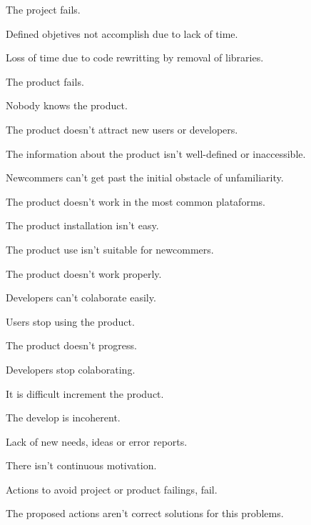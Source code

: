 \documentclass[twocolumn, 9pt]{extarticle}
\begin{document}
\begin{labelist}
\item The project fails.
  \begin{labelist}
    \item Defined objetives not accomplish due to lack of time.
    \item Loss of time due to code rewritting by removal of
      libraries.
  \end{labelist}
\item The product fails.
  \begin{labelist}
    \item Nobody knows the product.
    \item The product doesn't attract new users or developers.
      \begin{labelist}
        \item The information about the product isn't well-defined or
          inaccessible.
        \item Newcommers can't get past the initial obstacle of
          unfamiliarity.
        \item The product doesn't work in the most common plataforms.
        \item The product installation isn't easy.
        \item The product use isn't suitable for newcommers.
        \item The product doesn't work properly.
        \item Developers can't colaborate easily.
      \end{labelist}
    \item Users stop using the product.
      \begin{labelist}
        \item The product doesn't progress.
      \end{labelist}
    \item Developers stop colaborating.
      \begin{labelist}
        \item It is difficult increment the product.
        \item The develop is incoherent.
        \item Lack of new needs, ideas or error reports.
        \item There isn't continuous motivation.
      \end{labelist}
  \end{labelist}
\item Actions to avoid project or product failings, fail.
  \begin{labelist}
    \item The proposed actions aren't correct solutions for this
      problems.
  \end{labelist}
\end{labelist}
\end{document}
